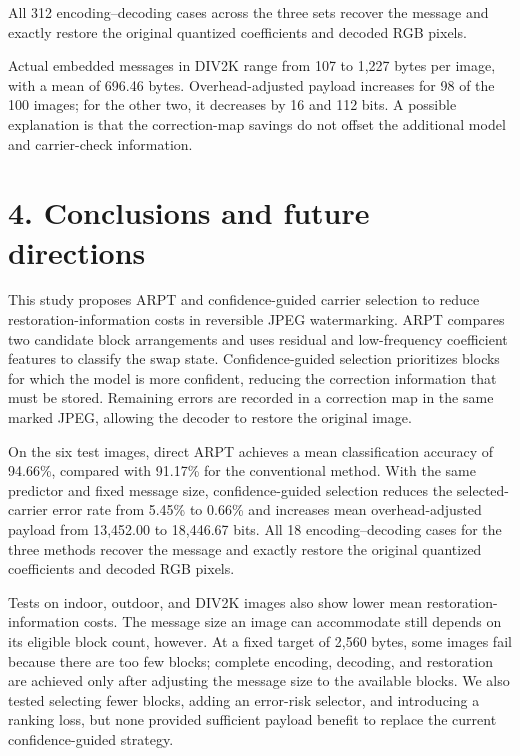 \documentclass[
  11pt,
  a4paper,
]{article}
\newcounter{none} %
\begin{document}
All 312 encoding--decoding cases across the three sets recover the
message and exactly restore the original quantized coefficients and
decoded RGB pixels.

Actual embedded messages in DIV2K range from 107 to 1,227 bytes per
image, with a mean of 696.46 bytes. Overhead-adjusted payload increases
for 98 of the 100 images; for the other two, it decreases by 16 and 112
bits. A possible explanation is that the correction-map savings do not
offset the additional model and carrier-check information.

\section*{4. Conclusions and future
directions}\label{conclusions-and-future-directions}

This study proposes ARPT and confidence-guided carrier selection to
reduce restoration-information costs in reversible JPEG watermarking.
ARPT compares two candidate block arrangements and uses residual and
low-frequency coefficient features to classify the swap state.
Confidence-guided selection prioritizes blocks for which the model is
more confident, reducing the correction information that must be stored.
Remaining errors are recorded in a correction map in the same marked
JPEG, allowing the decoder to restore the original image.

On the six test images, direct ARPT achieves a mean classification
accuracy of 94.66\%, compared with 91.17\% for the conventional method.
With the same predictor and fixed message size, confidence-guided
selection reduces the selected-carrier error rate from 5.45\% to 0.66\%
and increases mean overhead-adjusted payload from 13,452.00 to 18,446.67
bits. All 18 encoding--decoding cases for the three methods recover the
message and exactly restore the original quantized coefficients and
decoded RGB pixels.

Tests on indoor, outdoor, and DIV2K images also show lower mean
restoration-information costs. The message size an image can accommodate
still depends on its eligible block count, however. At a fixed target of
2,560 bytes, some images fail because there are too few blocks; complete
encoding, decoding, and restoration are achieved only after adjusting
the message size to the available blocks. We also tested selecting fewer
blocks, adding an error-risk selector, and introducing a ranking loss,
but none provided sufficient payload benefit to replace the current
confidence-guided strategy.
\end{document}
